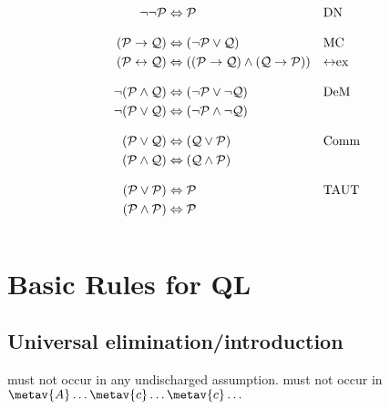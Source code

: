 \begin{align*}
\lnot\lnot \mathcal{P} & \Leftrightarrow \mathcal{P} && \text{DN}\\[2ex]
(\mathcal{P} \rightarrow \mathcal{Q}) & \Leftrightarrow (\lnot \mathcal{P} \lor \mathcal{Q})
&& \text{MC}\\
(\mathcal{P} \leftrightarrow \mathcal{Q}) & \Leftrightarrow ((\mathcal{P} \rightarrow \mathcal{Q}) \land  (\mathcal{Q} \rightarrow \mathcal{P}))
&& \text{\ensuremath{\leftrightarrow}ex}\\[2ex]
\lnot(\mathcal{P} \land \mathcal{Q}) & \Leftrightarrow (\lnot\mathcal{P} \lor \lnot\mathcal{Q})
&& \text{DeM}\\
\lnot(\mathcal{P} \lor \mathcal{Q}) & \Leftrightarrow (\lnot\mathcal{P} \land \lnot\mathcal{Q}) \\[2ex]
(\mathcal{P} \lor \mathcal{Q}) & \Leftrightarrow (\mathcal{Q} \lor \mathcal{P}) &&\text{Comm}\\
(\mathcal{P} \land \mathcal{Q}) & \Leftrightarrow (\mathcal{Q} \land \mathcal{P})\\[2ex]
(\mathcal{P} \lor \mathcal{P}) & \Leftrightarrow \mathcal{P} && \text{TAUT}\\
(\mathcal{P} \land \mathcal{P}) & \Leftrightarrow \mathcal{P}\\[2ex]
\end{align*}
\newpage
\section{Basic Rules for QL}
\subsection*{Universal elimination/introduction}
\begin{multicols}{2}
\begin{fitchproof}
	 
\end{fitchproof}

\begin{fitchproof}
	 
\end{fitchproof}

 must not occur in any undischarged assumption.  must not occur in $\metav{A}\ldots \metav{c} \ldots \metav{c}\ldots$
\end{multicols}
